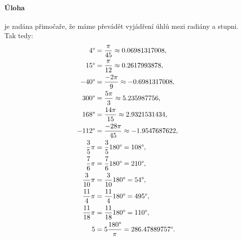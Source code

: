\documentclass[11pt, a4paper]{article}
\begin{document}
	\newpage
		
		\paragraph{Úloha} je zadána přimočaře, že máme převádět vyjádření úhlů mezi radiány a stupni. Tak tedy:
		\begin{align}
			4\degree &= \frac{\pi}{45} \approx 0.06981317008,
		\\
			15\degree &= \frac{\pi}{12} \approx 0.2617993878,
		\\
			-40\degree &= \frac{-2\pi}{9} \approx -0.6981317008,
		\\
			300\degree &= \frac{5\pi}{3} \approx 5.235987756,
		\\
			168\degree &= \frac{14\pi}{15} \approx 2.9321531434,
		\\
			-112\degree &= \frac{-28\pi}{45} \approx -1.9547687622,
		\\
			\frac 35 \pi &= \frac 35 180\degree = 108\degree,
		\\
			\frac 76 \pi &= \frac 76 180\degree = 210\degree,
		\\
			\frac{3}{10}\pi &= \frac{3}{10} 180\degree = 54\degree,
		\\
			\frac{11}{4} \pi &= \frac{11}{4} 180\degree = 495\degree,
		\\
			\frac{11}{18} \pi &= \frac{11}{18} 180\degree = 110\degree,
		\\
			5 &= 5 \frac{180\degree}{\pi} = 286.47889757\degree.
		\end{align}
	
	
\end{document}
